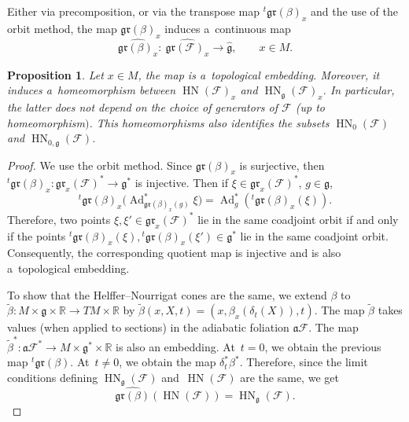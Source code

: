 \documentclass[pdftex]{sigma}
\newcommand{\tsp}[1]{{}^t \! #1} %
\newcommand{\R}{\mathbb R} %
\newcommand{\F}{\mathcal{F}} %
\newcommand{\Ad}{\operatorname{Ad}} %
\newcommand{\g}{\mathfrak{g}} %
\newcommand{\HN}{\operatorname{HN}} %
\newcommand{\Fb}{\mathcal{F}} %
\newcommand{\gr}{\mathfrak{gr}} %
\numberwithin{equation}{section}
\newtheorem{prop}[thm]{Proposition}
\theoremstyle{definition}
\begin{document}
Either via precomposition, or via the transpose map $\tsp{}\gr(\beta)_x $ and the use of the orbit method, the map $\gr(\beta)_x$ induces a~continuous map
\[\widehat{\gr(\beta)_x} \colon\ \widehat{\gr(\Fb)_x} \to \widehat{\g},\qquad x \in M.\]

\begin{prop}\label{Proposition : Independence HN}
 Let $x\in M$, the map \smash{$\widehat{\gr(\beta)_x}$} is a~topological embedding. Moreover, it induces a~homeomorphism between $\HN(\Fb)_x$ and $\HN_{\g}(\Fb)_x$. In particular, the latter does not depend on the choice of generators of $\Fb$ {\rm(}up to homeomorphism$)$. This homeomorphisms also identifies the subsets $\HN_0(\F)$ and $\HN_{0,\g}(\F)$.
\end{prop}

\begin{proof}
 We use the orbit method. Since $\gr(\beta)_x$ is surjective, then $\tsp\gr(\beta)_x\colon \gr_x(\Fb)^* \to \g^*$ is injective. Then if $\xi \in \gr_x(\Fb)^*$, $g \in \g$,
 \[\tsp\gr(\beta)_x\bigl(\Ad^*_{\gr(\beta)_x(g)}\xi\bigr) = \Ad^*_g(\tsp\gr(\beta)_x(\xi)).
 \]
 Therefore, two points $\xi,\xi' \in \gr_x(\Fb)^*$ lie in the same coadjoint orbit if and only if the points $\tsp\gr(\beta)_x(\xi),\tsp\gr(\beta)_x(\xi') \in \g^*$ lie in the same coadjoint orbit. Consequently, the corresponding quotient map \smash{$\widehat{\gr(\beta)} \colon \widehat{\gr_x(\Fb)} \to \widehat{\g}$} is injective and is also a~topological embedding.

 To show that the Helffer--Nourrigat cones are the same, we extend $\beta$ to $\widetilde{\beta} \colon M \times \g \times \R \to TM \times \R$ by $\widetilde{\beta}(x,X,t) = (x,\beta_x(\delta_t(X)),t)$.
 The map $\widetilde{\beta}$ takes values (when applied to sections) in the adiabatic foliation $\mathfrak{a}\F$. The map $\widetilde{\beta}^* \colon \mathfrak{a}\F^*\to M \times \g^* \times \R$ is also an embedding. At~${t=0}$, we obtain the previous map $\tsp\gr(\beta)$. At~${t\neq 0}$, we obtain the map $\delta^*_t\beta^*$. Therefore, since the limit conditions defining $\HN_{\g}(\F)$ and~$\HN(\F)$ are the same, we get
 \[\widehat{\gr(\beta)}(\HN(\Fb)) = \HN_{\g}(\Fb).\tag*{\qed}
 \]\renewcommand{\qed}{}
\end{proof}
\end{document}
